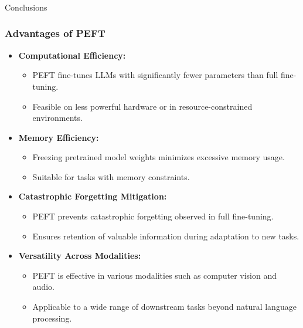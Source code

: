 \begin{frame}[fragile]\frametitle{}
\begin{center}
{\Large Conclusions}
\end{center}
\end{frame}


\begin{frame}[fragile]\frametitle{Advantages of PEFT}
  \begin{itemize}
    \item \textbf{Computational Efficiency:}
      \begin{itemize}
        \item PEFT fine-tunes LLMs with significantly fewer parameters than full fine-tuning.
        \item Feasible on less powerful hardware or in resource-constrained environments.
      \end{itemize}
    \item \textbf{Memory Efficiency:}
      \begin{itemize}
        \item Freezing pretrained model weights minimizes excessive memory usage.
        \item Suitable for tasks with memory constraints.
      \end{itemize}
    \item \textbf{Catastrophic Forgetting Mitigation:}
      \begin{itemize}
        \item PEFT prevents catastrophic forgetting observed in full fine-tuning.
        \item Ensures retention of valuable information during adaptation to new tasks.
      \end{itemize}
    \item \textbf{Versatility Across Modalities:}
      \begin{itemize}
        \item PEFT is effective in various modalities such as computer vision and audio.
        \item Applicable to a wide range of downstream tasks beyond natural language processing.
      \end{itemize}
  \end{itemize}
\end{frame}


